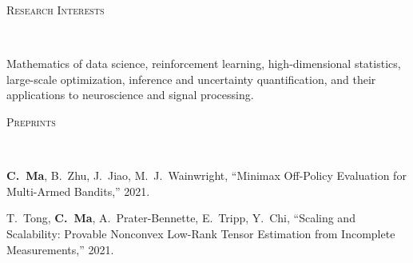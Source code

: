 \documentclass[a4paper, 10pt]{article}
\newenvironment{changemargin}[2]{%
  \begin{list}{}{%
    \setlength{\topsep}{0pt}%
    \setlength{\leftmargin}{#1}%
    \setlength{\rightmargin}{#2}%
    \setlength{\listparindent}{\parindent}%
    \setlength{\itemindent}{\parindent}%
    \setlength{\parsep}{\parskip}%
  }%
  \item[]}{\end{list}
}
\newcommand{\lineover}{
	\begin{changemargin}{-0.05in}{-0.05in}
		\vspace*{-8pt}
		\hrulefill \\
		\vspace*{-2pt}
	\end{changemargin}
}
\newcommand{\header}[1]{
	\begin{changemargin}{-0.5in}{-0.5in}
		\scshape{#1}\\
  	\lineover
	\end{changemargin}
}
\newenvironment{body} {
	\vspace*{-16pt}
	\begin{changemargin}{-0.3in}{-0.5in}
  }	
	{\end{changemargin}
}
\begin{document}
\bigskip
\header{\LARGE{Research Interests}}
\begin{body}
\vspace{18pt}
Mathematics of data science, reinforcement learning, high-dimensional statistics, large-scale optimization, inference and uncertainty quantification, and their applications to neuroscience and signal processing.
\end{body}



\bigskip
\header{\LARGE{Preprints}}
\begin{body}
	\vspace{18pt}
	\begin{enumerate}[label={[{P}{{\arabic*}}]}]

\item \textbf{C.~Ma}, B.~Zhu, J.~Jiao, M.~J.~Wainwright, {``Minimax Off-Policy Evaluation for Multi-Armed Bandits,''} 2021. \\


	

\item T.~Tong, \textbf{C.~Ma}, A.~Prater-Bennette, E.~Tripp, Y.~Chi, {``Scaling and Scalability: Provable Nonconvex Low-Rank Tensor
Estimation from Incomplete Measurements,''} 2021. \\

	\end{enumerate}
\end{body}
\end{document}
